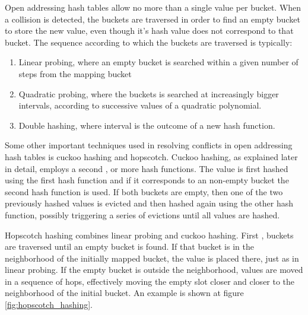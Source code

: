 Open addressing hash tables allow no more than a single value per bucket. When a collision is detected, the buckets are traversed in order to find an empty bucket to store the new value, even though it’s hash value does not correspond to that bucket. The sequence according to which the buckets are traversed is typically:

\begin{enumerate}
	\item Linear probing, where an empty bucket is searched within a given number of steps from the mapping bucket
	\item Quadratic probing, where the buckets is searched at increasingly bigger intervals, according to successive values of a quadratic polynomial. 
	\item Double hashing, where interval is the outcome of a new hash function.
\end{enumerate}

 Some other important techniques used in resolving conflicts in open addressing hash tables is cuckoo hashing and hopscotch. Cuckoo hashing, as explained later in detail, employs a second , or more hash functions. The value is first hashed using the first hash function  and if it corresponds to an non-empty bucket the second hash function is used. If both buckets are empty, then one of the two previously hashed values is evicted and then hashed again using the other hash function, possibly triggering a series of evictions until all values are hashed.


Hopscotch hashing combines linear probing and cuckoo hashing. First , buckets are traversed until an empty bucket is found. If that bucket is in the neighborhood of the initially mapped bucket, the value is placed there, just as in linear probing. If the empty bucket is outside the neighborhood, values are moved in a sequence of hops, effectively moving the empty slot closer and closer to the neighborhood of the initial bucket. An example is shown at figure \ref{fig:hopscotch_hashing}.

